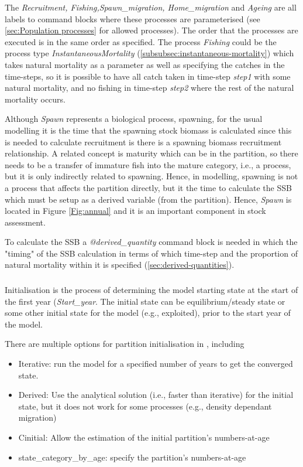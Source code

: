 The \textit{Recruitment, Fishing,Spawn\_migration, Home\_migration} and \textit{Ageing } are all labels to command blocks where these processes are parameterised (see \ref{sec:Population processes} for allowed processes). The order that the  processes are executed is in the same order as specified. The process \textit{Fishing} could be the process type \textit{InstantaneousMortality} (\ref{subsubsec:instantaneous-mortality}) which takes natural mortality as a parameter as well as specifying the catches in the time-steps, so it is possible to have all catch taken in time-step \textit{step1} with some natural mortality, and no fishing in time-step \textit{step2} where the rest of the natural mortality occurs.

Although \textit{Spawn} represents a biological process, spawning, for the usual modelling it is the time that the spawning stock biomass is calculated since this is needed to calculate recruitment is there is a spawning biomass recruitment relationship. A related concept is maturity which can be in the partition, so there needs to be a transfer of immature fish into the mature category, i.e., a process, but it is only indirectly related to spawning. Hence, in modelling, spawning is not a process that affects the partition directly, but it the time to calculate the SSB which must be setup as a derived variable (from the partition). Hence, \textit{Spawn} is located in Figure \ref{Fig:annual} and it is an important component in stock assessment.

To calculate the SSB a \textit{@derived\_quantity} command block is needed in which the "timing" of the SSB calculation in terms of which time-step and the proportion of natural mortality within it is specified (\ref{sec:derived-quantities}).

\subsubsection{}\label{subsec:initialisation}

Initialisation is the process of determining the model starting state at the start of the first year (\textit{Start\_year}. The initial state can be equilibrium/steady state or some other initial state for the model (e.g., exploited), prior to the start year of the model. 

There are multiple options for partition initialisation in \CNAME, including

\begin{itemize}
	\item Iterative: run the model for a specified number of years to get the converged state.
	\item Derived: Use the analytical solution (i.e., faster than iterative) for the initial state, but it does not work for some processes (e.g., density dependant migration) 
	\item Cinitial: Allow the estimation of the initial partition's numbers-at-age
	\item state\_category\_by\_age: specify the partition's numbers-at-age 
\end{itemize}

